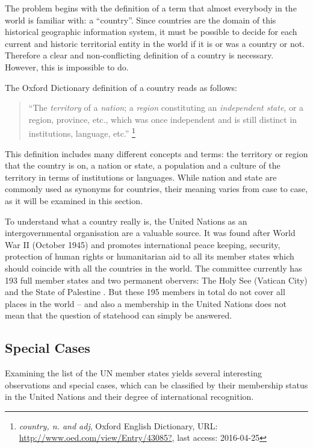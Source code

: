 The problem begins with the definition of a term that almost everybody in the world is familiar with: a ``country''. Since countries are the domain of this historical geographic information system, it must be possible to decide for each current and historic territorial entity in the world if it is or was a country or not. Therefore a clear and non-conflicting definition of a country is necessary. However, this is impossible to do.

The Oxford Dictionary definition of a country reads as follows:
\begin{quote}
  ``The \emph{territory} of a \emph{nation}; a \emph{region} constituting an \emph{independent state}, or a region, province, etc., which was once independent and is still distinct in institutions, language, etc.''
  \footnote{\textit{country, n. and adj}, Oxford English Dictionary, URL: \url{http://www.oed.com/view/Entry/43085?}, last access: 2016-04-25}
\end{quote}

This definition includes many different concepts and terms: the territory or region that the country is on, a nation or state, a population and a culture of the territory in terms of institutions or languages. While nation and state are commonly used as synonyms for countries, their meaning varies from case to case, as it will be examined in this section.

To understand what a country really is, the United Nations as an intergovernmental organisation are a valuable source. It was found after World War II (October 1945) and promotes international peace keeping, security, protection of human rights or humanitarian aid to all its member states which should coincide with all the countries in the world. The committee currently has 193 full member states and two permanent obervers: The Holy See (Vatican City) and the State of Palestine \cite{UNmembers}. But these 195 members in total do not cover all places in the world -- and also a membership in the United Nations does not mean that the question of statehood can simply be answered.

\subsection{Special Cases} %
\label{sub:special_cases}

Examining the list of the UN member states yields several interesting observations and special cases, which can be classified by their membership status in the United Nations and their degree of international recognition.


